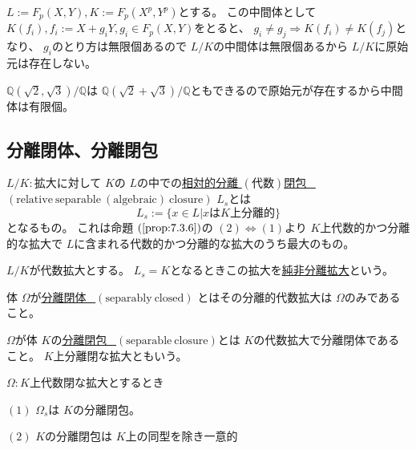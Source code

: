 \documentclass[../master_galois_theory]{subfiles}
\begin{document}
\begin{exam}
  $L := F_p(X,Y) , K := F_p(X^p , Y^p)$とする。
  この中間体として $K(f_i) , f_i := X + g_i Y , g_i \in F_p(X,Y)$をとると、
  $g_i \neq g_j \Rightarrow K(f_i) \neq K(f_j)$となり、
  $g_i$のとり方は無限個あるので $L/K$の中間体は無限個あるから
  $L/K$に原始元は存在しない。
\end{exam}

\begin{exam}
  $\mathbb{Q}(\sqrt{2} , \sqrt{3})/\mathbb{Q}$は
  $\mathbb{Q}(\sqrt{2} + \sqrt{3})/\mathbb{Q}$ともできるので原始元が存在するから中間体は有限個。
\end{exam}

\subsection{分離閉体、分離閉包}

\begin{defi}
  $L/K:$拡大に対して $K$の $L$の中での\underline{相対的分離 $(代数)$閉包 \  $(\mathrm{relative \  separable \  (algebraic) \  closure})$} $L_s$とは
  \[
  L_s := \{ x \in L | xは K上分離的 \}
  \]
  となるもの。
  これは命題 $(\mathrm{\ref{prop:7.3.6}})$の $(2) \Leftrightarrow (1)$より $K$上代数的かつ分離的な拡大で
  $L$に含まれる代数的かつ分離的な拡大のうち最大のもの。
\end{defi}

\begin{defi}
  $L/K$が代数拡大とする。
  $L_s = K$となるときこの拡大を\underline{純非分離拡大}という。
\end{defi}

\begin{defi}
  体 $\Omega$が\underline{分離閉体 \  $(\mathrm{separably \  closed})$}
  とはその分離的代数拡大は $\Omega$のみであること。
\end{defi}

\begin{defi}
  $\Omega$が体 $K$の\underline{分離閉包 \  $(\mathrm{separable \  closure})$}とは
  $K$の代数拡大で分離閉体であること。
  $K$上分離閉な拡大ともいう。
\end{defi}

\begin{prop} \label{prop:9.11}
  $\Omega:K$上代数閉な拡大とするとき

  $(1)$
  $\Omega_s$は $K$の分離閉包。

  $(2)$
  $K$の分離閉包は $K$上の同型を除き一意的
\end{prop}
\end{document}
